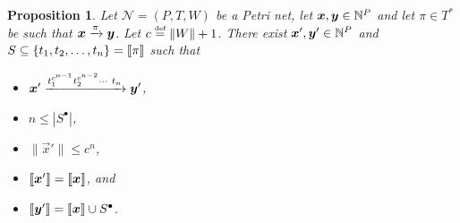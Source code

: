 \newcommand{\pn}{\mathcal{N}}
\newcommand{\norm}[1]{\lVert#1\rVert}
\newcommand{\pre}[1]{\ensuremath{{^\bullet #1}}}
\newcommand{\post}[1]{\ensuremath{{#1^\bullet}}}
\newcommand{\prepost}[1]{\ensuremath{{^\bullet {#1} ^\bullet}}}
\theoremstyle{plain}
\newtheorem{proposition}[theorem]{Proposition}

\begin{proposition}\label{prop:short:saturation}
  Let $\pn = (P, T, W)$ be a Petri net, let $\bm{x}, \bm{y} \in
  \mathbb{N}^P$ and let $\pi \in T^*$ be such that $\bm{x} \xrightarrow{\pi}
  \bm{y}$. Let $c \defeq \norm{W} + 1$. There exist $\bm{x}',
  \bm{y}' \in \mathbb{N}^P$ and $S \subseteq \{t_1, t_2, \ldots, t_n\} =
  \llbracket\pi\rrbracket$ such that
  \begin{itemize}
  \item $\bm{x}' \xrightarrow{t_1^{c^{n-1}} t_2^{c^{n-2}} \cdots\ t_n}
    \bm{y}'$,

  \item $n \leq |\post{S}|$,

  \item $\norm{\vec{x}'} \leq c^n$,

  \item $\llbracket\bm{x}'\rrbracket = \llbracket\bm{x}\rrbracket$, and 

  \item $\supp{\vec{y}'} = \supp{\vec{x}} \cup \post{S}$.
  \end{itemize}
\end{proposition}

